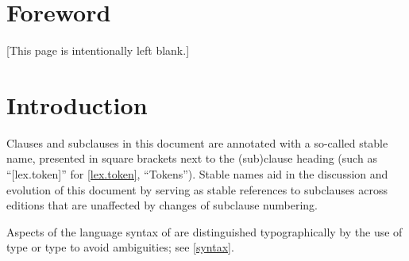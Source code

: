 
\chapter{Foreword}

[This page is intentionally left blank.]

\chapter{Introduction}

Clauses and subclauses in this document are annotated
with a so-called stable name,
presented in square brackets next to the (sub)clause heading
(such as ``[lex.token]'' for \ref{lex.token}, ``Tokens'').
Stable names aid in the discussion and evolution of this document
by serving as stable references to subclauses across editions
that are unaffected by changes of subclause numbering.

Aspects of the language syntax of \Cpp{} are distinguished typographically
by the use of  type
or  type to avoid ambiguities; see \ref{syntax}.
